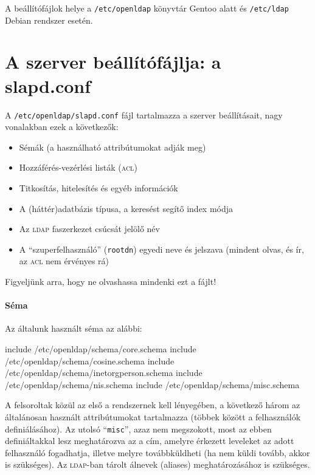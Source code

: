 A beállítófájlok helye a \texttt{/etc/openldap} könyvtár Gentoo alatt és \texttt{/etc/ldap} Debian rendszer esetén.

\section{A szerver beállítófájlja: a slapd.conf}
A \texttt{/etc/openldap/slapd.conf} fájl tartalmazza a szerver beállításait, nagy vonalakban ezek a következők:

\begin{itemize}
\item Sémák (a használható attribútumokat adják meg)
\item Hozzáférés-vezérlési listák (\textsc{acl})
\item Titkosítás, hitelesítés és egyéb információk
\item A (háttér)adatbázis típusa, a keresést segítő index módja
\item Az \textsc{ldap} faszerkezet csúcsát jelölő név
\item A ``szuperfelhasználó'' (\texttt{rootdn}) egyedi neve és jelszava (mindent olvas, és ír, az \textsc{acl} nem érvényes rá)
\end{itemize}  

Figyeljünk arra, hogy ne olvashassa mindenki ezt a fájlt!

\paragraph{Séma} Az általunk használt séma az alábbi:

\begin{VerbExample}
include         /etc/openldap/schema/core.schema
include         /etc/openldap/schema/cosine.schema
include         /etc/openldap/schema/inetorgperson.schema
include         /etc/openldap/schema/nis.schema
include         /etc/openldap/schema/misc.schema
\end{VerbExample}
  
A felsoroltak közül az első a rendszernek kell lényegében, a következő három az általánosan használt attribútumokat
tartalmazza (többek között a felhasználók definiálásához). Az utolsó ``\texttt{misc}'', azaz nem megszokott, most az
ebben definiáltakkal lesz meghatározva az a cím, amelyre érkezett leveleket az adott felhasználó fogadhatja, illetve
melyre továbbküldheti (ha nem küldi tovább, akkor is szükséges). Az \textsc{ldap}-ban tárolt álnevek (aliases)
meghatározásához is szükséges.

